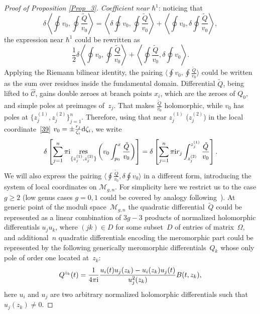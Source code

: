 \documentclass[pdftex]{sigma}
\numberwithin{equation}{section}
\theoremstyle{definition}
\begin{document}
\begin{proof}[Proof of Proposition \ref{Prop_3}]
\textit{Coefficient near $\hbar^1$}: noticing that
\begin{equation*}%
\delta\left\langle \oint v_0, \oint \frac{\tilde{Q}}{v_0}\right\rangle =\left\langle \delta \oint v_0, \oint \frac{\tilde{Q}}{v_0}\right\rangle +\left\langle \oint v_0, \delta \oint \frac{\tilde{Q}}{v_0}\right\rangle,
\end{equation*}
the expression near $\hbar^1$ could be rewritten as
\begin{equation*}%
\frac{1}{2}\delta\left\langle \oint v_0, \oint \frac{\tilde{Q}}{v_0}\right\rangle +\left\langle \oint \frac{\tilde{Q}}{v_0}, \delta \oint v_0\right\rangle .
\end{equation*}
 Applying the Riemann bilinear identity, the pairing $\big\langle \oint v_0, \oint \frac{\tilde{Q}}{v_0}\big\rangle $ could be written as the sum over residues inside the fundamental domain. Differential $\tilde{Q}$, being lifted to $\hat{\mathcal{C}}$, gains double zeroes at branch points $x_i$, which are the zeroes of $Q_0$, and simple poles at preimages of~$z_j$. That makes $\frac{\tilde{Q}}{v_0}$ holomorphic, while $v_0$ has poles at
$\big\{z^{(1)}_j, z^{(2)}_j \big\}^n_{j=1}$. Therefore, using that near $z^{(1)}_j$ \big($z^{(2)}_j$\big) in the local coordinate~\eqref{39} $v_0=\pm \frac{r_j}{\zeta_i}{\rm d}\zeta_i$, we write
\begin{equation}\label{109}\delta
\left[\sum^n_{j=1}\pi {\rm i} \underset{\{z^{(1)}_j, z^{(2)}_j \}}{\rm res}\left(v_0
\int^x_{p_0}\frac{\tilde{Q}}{v_0} \right)\right]=\delta\left[\sum^n_{j=1}\pi{\rm i} r_j
\int^{z^{(1)}_j}_{z^{(2)}_j}\frac{\tilde{Q}}{v_0} \right]. \end{equation}
We will also express the pairing $\big\langle \oint \frac{\tilde{Q}}{v_0}, \delta \oint v_0\big\rangle $ in a different form, introducing the system of local coordinates on $\mathcal{M}_{g,n}$. For simplicity here we restrict us to the case $g \geq 2$ (low genus cases $g=0,1$ could be covered by analogy following~\cite{korotkin2018periods}). At generic point of the moduli space~$\mathcal{M}_{g,n}$ the quadratic differential~$\tilde{Q}$ could be represented as a linear combination of $3g-3$ products of normalized holomorphic differentials $u_j u_k$, where $(jk) \in D$ for some subset~$D$ of entries of matrix~$\Omega$, and additional~$n$ quadratic differentials encoding the meromorphic part could be represented by the following generically meromorphic differentials~$Q_k$ whose only pole of order one located at~$z_k$:
\begin{equation}\label{110}
Q^{z_k}(t)=\frac{1}{4 \pi {\rm i}}\frac{u_i(t)u_j(z_k)-u_i(z_k)u_j(t)}{u_j^2(z_k)}B(t, z_k),
\end{equation}
here $u_i$ and $u_j$ are two arbitrary normalized holomorphic differentials such that $u_j(z_k) \neq 0$.


\end{proof}
\end{document}

